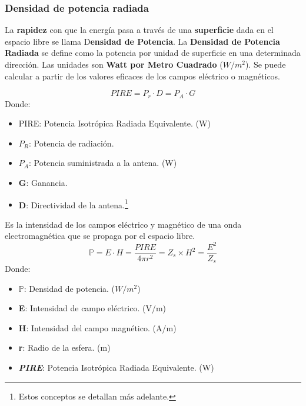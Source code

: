 \documentclass[
	12pt, %
	fleqn, %
	a4paper, %
	oneside, %
]{LegrandOrangeBook}
\begin{document}
\subsubsection{Densidad de potencia radiada}
La \textbf{rapidez} con que la energía pasa a través de una \textbf{superficie} dada en el espacio libre se llama D\textbf{ensidad de Potencia}. La \textbf{Densidad de Potencia Radiada} se define como la potencia por unidad de superficie en una determinada dirección. Las unidades son \textbf{Watt por Metro Cuadrado} ($W/m^2$). Se puede calcular a partir de los valores eficaces de los campos eléctrico o magnéticos.
\begin{definition}
\begin{equation}
PIRE=P_r\cdot D=P_A\cdot G
\label{eq:pire}
\end{equation}
Donde:
\begin{itemize}
\item PIRE:  Potencia Isotrópica Radiada Equivalente. (W)
\item $P_R$: Potencia de radiación.
\item $P_A$: Potencia suministrada a la antena. (W)
\item \textbf{G}: Ganancia.
\item \textbf{D}: Directividad de la antena.\footnote{Estos conceptos se detallan más adelante.}
\end{itemize}
\end{definition}
\begin{definition}
Es la intensidad de los campos eléctrico y magnético de una onda electromagnética que se propaga por el espacio libre.
\begin{equation}
\mathbb{P}=E\cdot H=\frac{PIRE}{4\pi r^2}=Z_s\times H^2=\frac{E^2}{Z_s}
\label{eq:int campo}
\end{equation}
Donde:
\begin{itemize}
\item $\mathbb{P}$: Densidad de potencia. ($W/m^2$)
\item \textbf{E}: Intensidad de campo eléctrico. (V/m)
\item \textbf{H}: Intensidad del campo magnético. (A/m)
\item \textbf{r}: Radio de la esfera. (m)
\item \textbf{\textit{PIRE}}: Potencia Isotrópica Radiada Equivalente. (W)
\end{itemize}

\end{definition}
\end{document}
